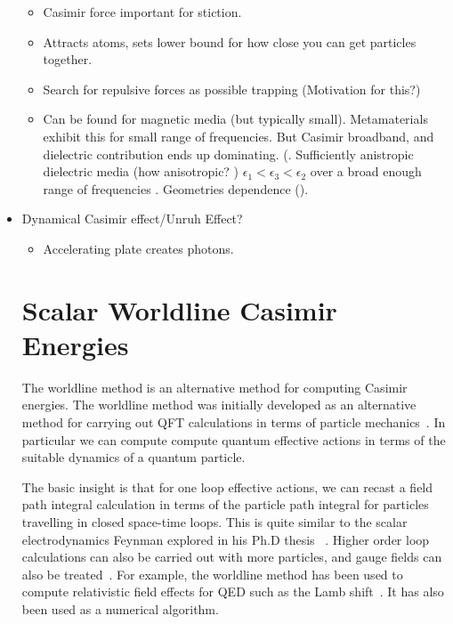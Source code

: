 \begin{itemize}
\begin{itemize}
\item Casimir force important for stiction.
\item Attracts atoms, sets lower bound for how close you can get particles together.
\item Search for repulsive forces as possible trapping (Motivation for this?)
\item Can be found for magnetic media (but typically small).
  Metamaterials exhibit this for small range of frequencies.
  But Casimir broadband, and dielectric contribution ends up dominating.
  (.
Sufficiently anistropic dielectric media (how anisotropic? )
 $\epsilon_1<\epsilon_3<\epsilon_2$ over a broad enough range of frequencies 
.
   Geometries dependence ().
\end{itemize}
\item Dynamical Casimir effect/Unruh Effect?
\begin{itemize}
  \item Accelerating plate creates photons.  
\end{itemize}


\section{Scalar Worldline Casimir Energies}

The worldline method is an alternative method for computing Casimir energies.
  The worldline method was initially developed as an alternative method for 
carrying out QFT calculations in terms of particle 
mechanics~\cite{McKeon1993, Strassler1992,Schubert2001}.
  In particular we can compute compute quantum effective actions in terms of
 the suitable dynamics of a quantum particle.

The basic insight is that for one loop effective actions, 
we can recast a field path integral calculation in terms of the particle path
 integral for particles travelling in closed space-time loops.
  This is quite similar to the scalar electrodynamics Feynman explored
 in his Ph.D thesis~\cite{Feynman1942, Brown2005}
.
  Higher order loop calculations can also be carried out with more particles, 
and gauge fields can also be treated~\cite{Schubert2001}.
  For example, the worldline method has been used to compute relativistic
 field effects for QED such as the Lamb shift~\cite{Schmidt1995}.
  It has also been used as a numerical algorithm\cite{Mazur2014}.


\end{itemize}
